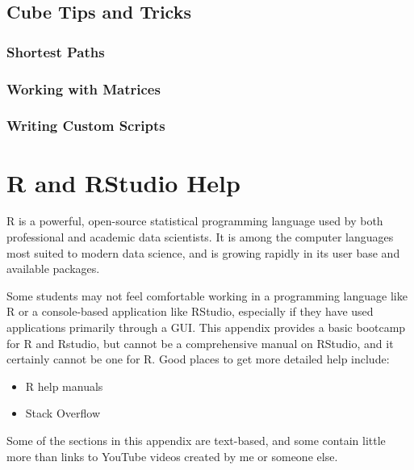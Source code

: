 \documentclass[]{book}
\providecommand{\tightlist}{%
  \setlength{\itemsep}{0pt}\setlength{\parskip}{0pt}}
\begin{document}
\hypertarget{cube-tips-and-tricks}{%
\section{Cube Tips and Tricks}\label{cube-tips-and-tricks}}

\hypertarget{shortest-paths}{%
\subsection{Shortest Paths}\label{shortest-paths}}

\hypertarget{working-with-matrices}{%
\subsection{Working with Matrices}\label{working-with-matrices}}

\hypertarget{writing-custom-scripts}{%
\subsection{Writing Custom Scripts}\label{writing-custom-scripts}}

\hypertarget{app-rstudio}{%
\chapter{R and RStudio Help}\label{app-rstudio}}

R is a powerful, open-source statistical programming language used by both
professional and academic data scientists. It is among the computer languages
most suited to modern data science, and is growing rapidly in its user base and
available packages.

Some students may not feel comfortable working in a programming language like R or
a console-based application like RStudio, especially if they have used applications
primarily through a GUI.
This appendix provides a basic bootcamp for R and Rstudio, but cannot be a
comprehensive manual on RStudio, and it certainly cannot be one for R. Good
places to get more detailed help include:

\begin{itemize}
\tightlist
\item
  R help manuals
\item
  Stack Overflow
\end{itemize}

Some of the sections in this appendix are text-based, and some contain little
more than links to YouTube videos created by me or someone else.
\end{document}
